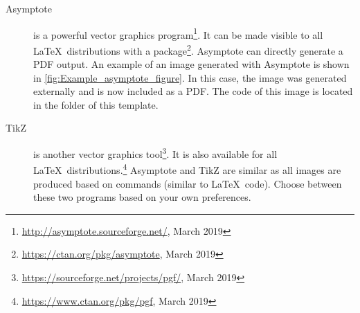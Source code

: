 \begin{description}
	\item[Asymptote] is a powerful vector graphics program\footnote{\url{http://asymptote.sourceforge.net/}, March 2019}. It can be made visible to all \LaTeX\ distributions with a package\footnote{\url{https://ctan.org/pkg/asymptote}, March 2019}. Asymptote can directly generate a PDF output. An example of an image generated with Asymptote is shown in \autoref{fig:Example_asymptote_figure}. In this case, the image was generated externally and is now included as a PDF. The code of this image is located in the  folder of this template.
	\item[TikZ] is another vector graphics tool\footnote{\url{https://sourceforge.net/projects/pgf/}, March 2019}. It is also available for all \LaTeX\ distributions.\footnote{\url{https://www.ctan.org/pkg/pgf}, March 2019} Asymptote and TikZ are similar as all images are produced based on commands (similar to \LaTeX\ code). Choose between these two programs based on your own preferences.
	

\end{description}
